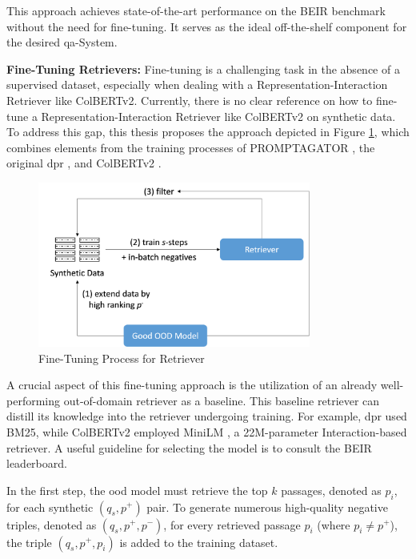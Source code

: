 This approach achieves state-of-the-art performance on the BEIR benchmark without the need for fine-tuning. It serves as the ideal off-the-shelf component for the desired \gls{qa}-System.

\noindent\textbf{Fine-Tuning Retrievers:} Fine-tuning is a challenging task in the absence of a supervised dataset, especially when dealing with a Representation-Interaction Retriever like ColBERTv2. Currently, there is no clear reference on how to fine-tune a Representation-Interaction Retriever like ColBERTv2 on synthetic data. To address this gap, this thesis proposes the approach depicted in Figure \ref{fig:retriever-fine-tuning}, which combines elements from the training processes of PROMPTAGATOR \cite{dai_promptagator_2022}, the original \gls{dpr} \cite{karpukhin_dense_2020}, and ColBERTv2 \cite{santhanam_colbertv2_2022}.

\begin{figure}
   \centering
    \includegraphics[width=0.8\textwidth]{Grafiken/Training.png}
    \caption{Fine-Tuning Process for Retriever}
    \label{fig:retriever-fine-tuning} 
\end{figure}

A crucial aspect of this fine-tuning approach is the utilization of an already well-performing out-of-domain retriever as a baseline. This baseline retriever can distill its knowledge into the retriever undergoing training. For example, \gls{dpr} used BM25, while ColBERTv2 employed MiniLM \cite{wang_multi-passage_2019}, a 22M-parameter Interaction-based retriever. A useful guideline for selecting the model is to consult the BEIR leaderboard.

In the first step, the \gls{ood} model must retrieve the top $k$ passages, denoted as $p_i$, for each synthetic $(q_s,p^{+})$ pair. To generate numerous high-quality negative triples, denoted as $(q_s, p^{+}, p^{-})$, for every retrieved passage $p_i$ (where $p_i \neq p^{+}$), the triple $(q_s, p^{+}, p_i)$ is added to the training dataset.


